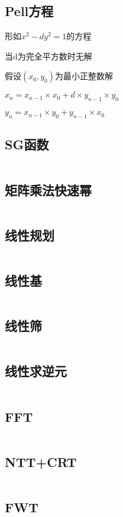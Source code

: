 \documentclass[UTF8]{ctexart}
\begin{document}
\subsection{Pell方程}

形如$x^2-dy^2=1$的方程\par

当d为完全平方数时无解\par

假设$(x_0,y_0)$为最小正整数解\par

$x_n = x_{n-1} \times x_0 + d \times y_{n-1} \times y_0$\par

$y_n = x_{n-1} \times y_0 + y_{n-1} \times x_0$

\subsection{SG函数}
\inputminted{cpp}{math/SG函数.cpp}
\subsection{矩阵乘法快速幂}
\inputminted{cpp}{math/矩阵乘法快速幂.cpp}
\subsection{线性规划}
\inputminted{cpp}{math/线性规划.cpp}
\subsection{线性基}
\inputminted{cpp}{math/线性基.cpp}
\subsection{线性筛}
\inputminted{cpp}{math/线性筛.cpp}
\subsection{线性求逆元}
\inputminted{cpp}{math/线性求逆元.cpp}
\subsection{FFT}
\inputminted{cpp}{math/FFT.cpp}
\subsection{NTT+CRT}
\inputminted{cpp}{math/NTT+CRT.cpp}
\subsection{FWT}
\inputminted{cpp}{math/FWT.cpp}
\end{document}
